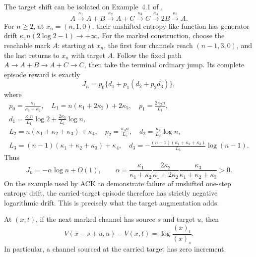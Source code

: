 \begin{remark}\label{rem:ack-example}
The target shift can be isolated on Example~4.1 of
\citet{AndersonCappellettiKim2020},
\[
 A\xrightarrow{\kappa_1}A+B\xrightarrow{\kappa_2}A+C
 \xrightarrow{\kappa_3}C\xrightarrow{\kappa_4}2B
 \xrightarrow{\kappa_5}A.
\]
For \(n\ge2\), at \(x_n=(n,1,0)\), their unshifted entropy-like function has
generator drift \(\kappa_1n(2\log2-1)\to+\infty\).  For the marked construction,
choose the reachable mark \(A\): starting at \(x_n\), the first four channels
reach \((n-1,3,0)\), and the last returns to \(x_n\) with target \(A\).
Follow the fixed path \(A\to A+B\to A+C\to C\), then take the terminal
ordinary jump.  Its complete episode reward is exactly
\begin{equation}\label{eq:ack-episode}
 J_n=p_0\{d_1+p_1(d_2+p_2d_3)\},
\end{equation}
where
\[
\begin{gathered}
 p_0=\frac{\kappa_1}{\kappa_1+\kappa_2},\quad
 L_1=n(\kappa_1+2\kappa_2)+2\kappa_5,\quad
 p_1=\frac{2\kappa_2n}{L_1},\\
 d_1=\frac{\kappa_1n}{L_1}\log2
       +\frac{2\kappa_5}{L_1}\log n,\\
 L_2=n(\kappa_1+\kappa_2+\kappa_3)+\kappa_4,\quad
 p_2=\frac{\kappa_3n}{L_2},\quad
 d_2=\frac{\kappa_4}{L_2}\log n,\\
 L_3=(n-1)(\kappa_1+\kappa_2+\kappa_3)+\kappa_4,\quad
 d_3=-\frac{(n-1)(\kappa_1+\kappa_2+\kappa_3)}{L_3}\log(n-1).
\end{gathered}
\]
Thus
\[
 J_n=-\alpha\log n+O(1),\qquad
 \alpha=\frac{\kappa_1}{\kappa_1+\kappa_2}
        \frac{2\kappa_2}{\kappa_1+2\kappa_2}
        \frac{\kappa_3}{\kappa_1+\kappa_2+\kappa_3}>0.
\]
On the example used by ACK to demonstrate failure of unshifted one-step
entropy drift, the carried-target episode therefore has strictly negative
logarithmic drift.  This is precisely what the target augmentation adds.
\end{remark}

\begin{lemma}\label{lem:identity}
At \((x,t)\), if the next marked channel has source \(s\) and target \(u\),
then
\begin{equation}\label{eq:identity}
  V(x-s+u,u)-V(x,t)=\log\frac{(x)_t}{(x)_s}.
\end{equation}
In particular, a channel sourced at the carried target has zero increment.
\end{lemma}

